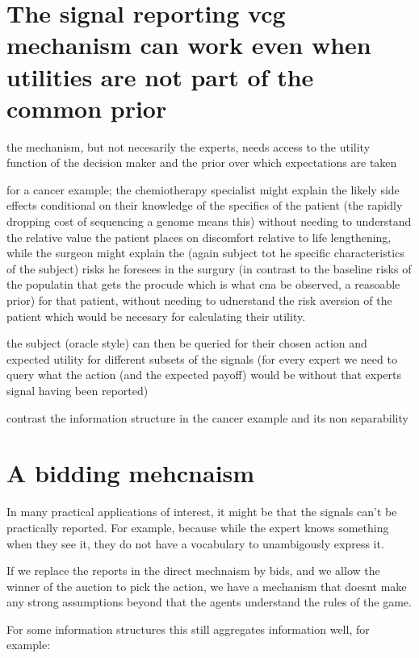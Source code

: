 \section{The signal reporting vcg mechanism can work even when utilities are not part of the common prior}

the mechanism, but not necesarily the experts, needs access to the utility function of the decision maker and the prior over which expectations are taken 

for a cancer example; the chemiotherapy specialist might explain the likely side effects conditional on their knowledge of the specifics of the patient (the rapidly dropping cost of sequencing a genome means this) without needing to understand the relative value the patient places on discomfort relative to life lengthening, while the surgeon might explain the (again subject tot he specific characteristics of the subject) risks he foresees in the surgury (in contrast to the baseline risks of the populatin that gets the procude which is what cna be observed, a reasoable prior) for that patient, without needing to udnerstand the risk aversion of the patient which would be necesary for calculating their utility.

the subject (oracle style) can then be queried for their chosen action and expected utility for different subsets of the signals (for every expert we need to query what the action (and the expected payoff) would be without that experts signal having been reported)

contrast the information structure in the cancer example and its non separability 


\section{A bidding mehcnaism }

In many practical applications of interest, it might be that the signals can't be practically reported. For example, because while the expert knows something when they see it, they do not have a vocabulary to unambigously express it. 


If we replace the reports in the direct mechnaism by bids, and we allow the winner of the auction to pick the action, we have a mechanism that doesnt make any strong assumptions beyond that the agents understand the rules of the game.

For some information structures this still aggregates information well, for example:


